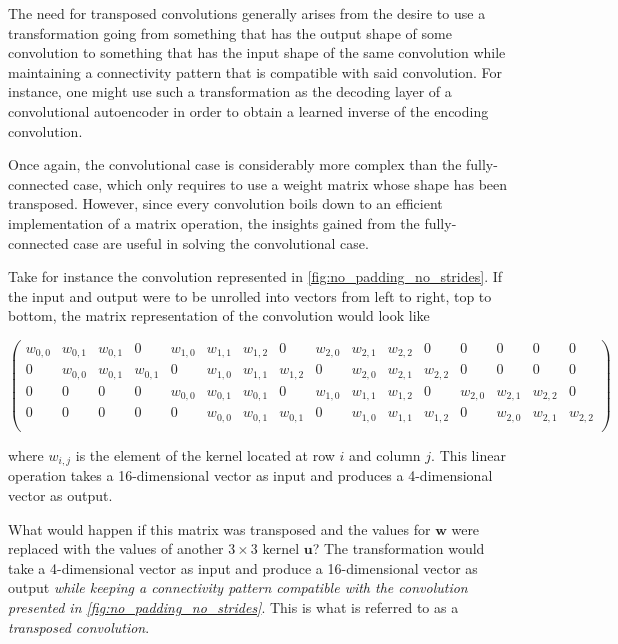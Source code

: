 \documentclass{article}
\begin{document}
The need for transposed convolutions generally arises from the desire to use a
transformation going from something that has the output shape of some
convolution to something that has the input shape of the same convolution while
maintaining a connectivity pattern that is compatible with said convolution.
For instance, one might use such a transformation as the decoding layer of a
convolutional autoencoder in order to obtain a learned inverse of the encoding
convolution.

Once again, the convolutional case is considerably more complex than the
fully-connected case, which only requires to use a weight matrix whose shape has
been transposed. However, since every convolution boils down to an efficient
implementation of a matrix operation, the insights gained from the
fully-connected case are useful in solving the convolutional case.

Take for instance the convolution represented in
\autoref{fig:no_padding_no_strides}. If the input and output were to be unrolled
into vectors from left to right, top to bottom, the matrix representation of the
convolution would look like

\begin{equation*}
    \begin{pmatrix}
    w_{0,0} & w_{0,1} & w_{0,1} & 0       & w_{1,0} & w_{1,1} & w_{1,2} & 0       &
    w_{2,0} & w_{2,1} & w_{2,2} & 0       & 0       & 0       & 0       & 0       \\
    0       & w_{0,0} & w_{0,1} & w_{0,1} & 0       & w_{1,0} & w_{1,1} & w_{1,2} &
    0       & w_{2,0} & w_{2,1} & w_{2,2} & 0       & 0       & 0       & 0       \\
    0       & 0       & 0       & 0       & w_{0,0} & w_{0,1} & w_{0,1} & 0       &
    w_{1,0} & w_{1,1} & w_{1,2} & 0       & w_{2,0} & w_{2,1} & w_{2,2} & 0       \\
    0       & 0       & 0       & 0       & 0       & w_{0,0} & w_{0,1} & w_{0,1} &
    0       & w_{1,0} & w_{1,1} & w_{1,2} & 0       & w_{2,0} & w_{2,1} & w_{2,2} \\
    \end{pmatrix}
\end{equation*}

where $w_{i,j}$ is the element of the kernel located at row $i$ and column $j$.
This linear operation takes a 16-dimensional vector as input and produces a
4-dimensional vector as output.

What would happen if this matrix was transposed and the values for $\mathbf{w}$
were replaced with the values of another $3 \times 3$ kernel $\mathbf{u}$? The
transformation would take a 4-dimensional vector as input and produce a
16-dimensional vector as output {\em while keeping a connectivity pattern
compatible with the convolution presented in
\autoref{fig:no_padding_no_strides}}. This is what is referred to as a {\em
transposed convolution}.
\end{document}
